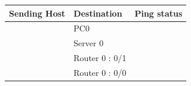 \documentclass[a4paper,11pt]{article}
\begin{document}
\begin{enumerate}





          \begin{table}[H]
              \centering
              \begin{tabular}{| m{9em}| m{12em}| m{9em} |}
                  \hline
                  {\cellcolor[rgb]{0.333,0.686,1}}\textbf{Sending Host}                & \textbf{Destination} & \textbf{Ping status}                                                  \\
                  \hline
                  {\cellcolor[rgb]{0.333,0.686,1}}                                     & PC0                  & {\cellcolor[rgb]{0.376,1,0.882}}                                      \\
                  \hhline{|>{\arrayrulecolor[rgb]{0.333,0.686,1}}->{\arrayrulecolor{black}}->{\arrayrulecolor[rgb]{0.376,1,0.882}}->{\arrayrulecolor{black}}|}
                  {\cellcolor[rgb]{0.333,0.686,1}}                                     & Server 0             & {\cellcolor[rgb]{0.376,1,0.882}}                                      \\
                  \hhline{|>{\arrayrulecolor[rgb]{0.333,0.686,1}}->{\arrayrulecolor{black}}->{\arrayrulecolor[rgb]{0.376,1,0.882}}->{\arrayrulecolor{black}}|}
                  {\cellcolor[rgb]{0.333,0.686,1}}                                     & Router 0 : 0/1       & {\cellcolor[rgb]{0.376,1,0.882}}                                      \\
                  \hhline{|>{\arrayrulecolor[rgb]{0.333,0.686,1}}->{\arrayrulecolor{black}}->{\arrayrulecolor[rgb]{0.376,1,0.882}}->{\arrayrulecolor{black}}|}
                  {\cellcolor[rgb]{0.333,0.686,1}}                                     & Router 0 : 0/0       & {\cellcolor[rgb]{0.376,1,0.882}}                                      \\

\end{tabular}
\end{table}
\end{enumerate}
\end{document}
